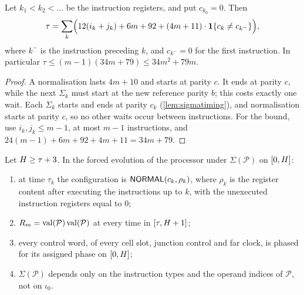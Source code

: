 \begin{corollary}\label{cor:tau}
Let $k_1<k_2<\dots$ be the instruction registers, and put $c_{k_0}=0$. Then
\[
\tau=\sum_{k}\Bigl(12(i_k+j_k)+6m+92+(4m+11)\cdot\mathbf{1}\{c_k\ne c_{k^-}\}\Bigr),
\]
where $k^-$ is the instruction preceding $k$, and $c_{k^-}=0$ for the first instruction. In
particular $\tau\le(m-1)(34m+79)\le 34m^2+79m$.
\end{corollary}

\begin{proof}
A normalisation lasts $4m+10$ and starts at parity $c$. It ends at parity $c$, while the next
$\Sigma_k$ must start at the new reference parity $b$; this costs exactly one wait. Each $\Sigma_k$
starts and ends at parity $c_k$ (\cref{lem:sigmatiming}), and normalisation starts at parity $c$, so
no other waits occur between instructions. For the bound, use $i_k,j_k\le m-1$, at most $m-1$
instructions, and $24(m-1)+6m+92+4m+11=34m+79$.
\end{proof}

\begin{theorem}\label{thm:forced}
Let $H\ge\tau+3$. In the forced evolution of the processor under $\Sigma(\mathcal P)$ on $[0,H]$:
\begin{enumerate}[label=(\alph*)]
\item\label{forced:inv} at time $\tau_k$ the configuration is $\textsf{NORMAL}(c_k,\rho_{k})$, where
  $\rho_{k}$ is the register content after executing the instructions up to $k$, with the unexecuted
  instruction registers equal to $0$;
\item\label{forced:out} $R_m=\operatorname{val}(\mathcal P)\operatorname{val}(\mathcal P)$ at every time in $[\tau,H+1]$;
\item\label{forced:phase} every control word, of every cell slot, junction control and far clock, is
  phased for its assigned phase on $[0,H]$;
\item\label{forced:oblivious} $\Sigma(\mathcal P)$ depends only on the instruction types and the
  operand indices of $\mathcal P$, not on $\iota_0$.
\end{enumerate}
\end{theorem}

